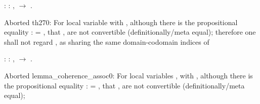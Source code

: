 \coqdocemptyline
\begin{coqdoccode}
\coqdocemptyline
\coqdocnoindent
{}  : \coqdockw{\ensuremath{\forall}}  : ,   \ensuremath{\rightarrow}    .\coqdoceol
\end{coqdoccode}
Aborted th270: For local variable  with  ,
although there is the propositional equality :   = ,
that  ,  are not convertible (definitionally/meta equal);
therefore one shall not regard ,   as sharing
the same domain-codomain indices of  \begin{coqdoccode}
\coqdocemptyline
\coqdocemptyline
\coqdocnoindent
{}  : \coqdockw{\ensuremath{\forall}}   : ,    \ensuremath{\rightarrow}     .\coqdoceol
\end{coqdoccode}
Aborted lemma\_coherence\_assoc0: For local variables ,  with   ,
although there is the propositional equality :   =  ,
that  ,   are not convertible (definitionally/meta equal);
